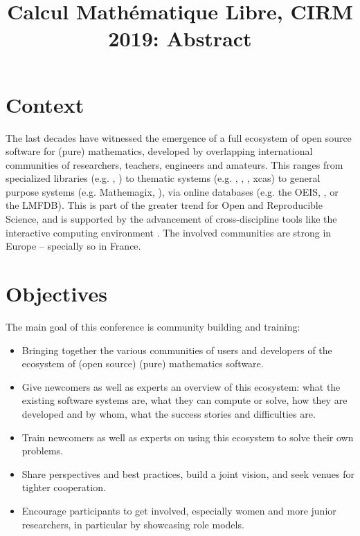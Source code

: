 \documentclass[12pt]{amsart}
\begin{document}
\title{Calcul Mathématique Libre, CIRM 2019: Abstract}
\maketitle
\thispagestyle{empty}

\section*{Context}

The last decades have witnessed the emergence of a full ecosystem of
open source software for (pure) mathematics, developed by overlapping
international communities of researchers, teachers, engineers and
amateurs. This ranges from specialized libraries (e.g. \MPIR, \Linbox)
to thematic systems (e.g. \GAP, \Pari, \Singular, xcas) to general
purpose systems (e.g. Mathemagix, \Sage), via online databases (e.g.
the OEIS, \MathHub, or the LMFDB). This is part of the greater trend
for Open and Reproducible Science, and is supported by the advancement
of cross-discipline tools like the interactive computing environment
\Jupyter. The involved communities are strong in Europe --
specially so in France.


\section*{Objectives}

The main goal of this conference is community building and training:
\begin{itemize}
\item Bringing together the various communities of users and
  developers of the ecosystem of (open source) (pure) mathematics
  software.
\item Give newcomers as well as experts an overview of this ecosystem:
  what the existing software systems are, what they can compute or solve, how
  they are developed and by whom, what the success stories and
  difficulties are.
\item Train newcomers as well as experts on using this ecosystem to
  solve their own problems.
\item Share perspectives and best practices, build a joint vision, and
  seek venues for tighter cooperation.
\item Encourage participants to get involved, especially
  women and more junior researchers, in particular by showcasing role models.
\end{itemize}
\end{document}
